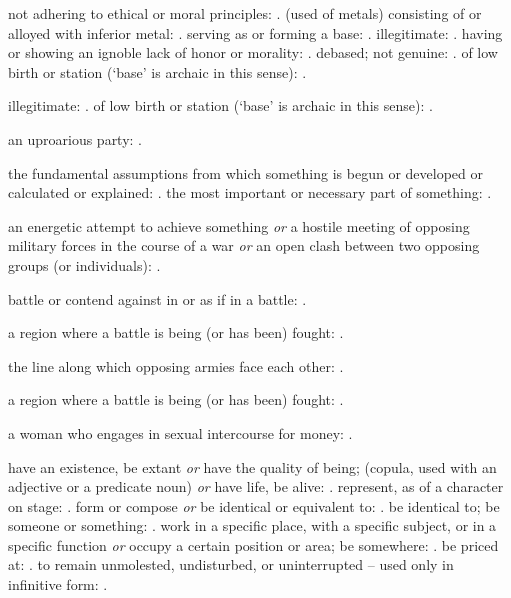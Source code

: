   not adhering to ethical or moral principles: . (used of metals) consisting of or alloyed with inferior metal: . serving as or forming a base: . illegitimate: . having or showing an ignoble lack of honor or morality: . debased; not genuine: . of low birth or station (`base' is archaic in this sense): .

  illegitimate: . of low birth or station (`base' is archaic in this sense): .

  an uproarious party: .

  the fundamental assumptions from which something is begun or developed or calculated or explained: . the most important or necessary part of something: .

  an energetic attempt to achieve something \textit{or} a hostile meeting of opposing military forces in the course of a war \textit{or} an open clash between two opposing groups (or individuals): .

  battle or contend against in or as if in a battle: .

  a region where a battle is being (or has been) fought: .

  the line along which opposing armies face each other: .

  a region where a battle is being (or has been) fought: .

  a woman who engages in sexual intercourse for money: .

  have an existence, be extant \textit{or} have the quality of being; (copula, used with an adjective or a predicate noun) \textit{or} have life, be alive: . represent, as of a character on stage: . form or compose \textit{or} be identical or equivalent to: . be identical to; be someone or something: . work in a specific place, with a specific subject, or in a specific function \textit{or} occupy a certain position or area; be somewhere: . be priced at: . to remain unmolested, undisturbed, or uninterrupted -- used only in infinitive form: .

